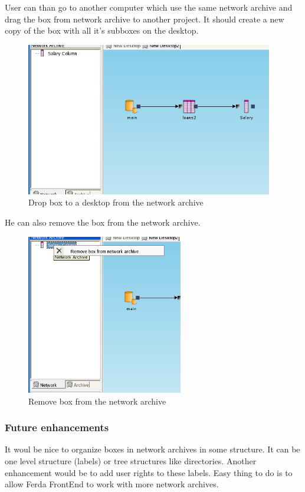 \documentclass{article}
\begin{document}
User can than go to another computer which use the same network archive and drag the box from network archive to another project. It should create a new copy of the box with all it's subboxes on the desktop.
\begin{figure}
	\includegraphics[width=10.8cm]{network_archive_drop_to_desktop}
	\caption{Drop box to a desktop from the network archive}
\end{figure}
He can also remove the box from the network archive.
\begin{figure}
	\includegraphics[height=7cm]{network_archive_remove_box}
	\caption{Remove box from the network archive}
\end{figure}

\subsubsection{Future enhancements}
It woul be nice to organize boxes in network archives in some structure. It can be one level structure (labels) or tree structures like directories. Another enhancement would be to add user rights to these labels. Easy thing to do is to allow Ferda FrontEnd to work with more network archives.
\end{document}
